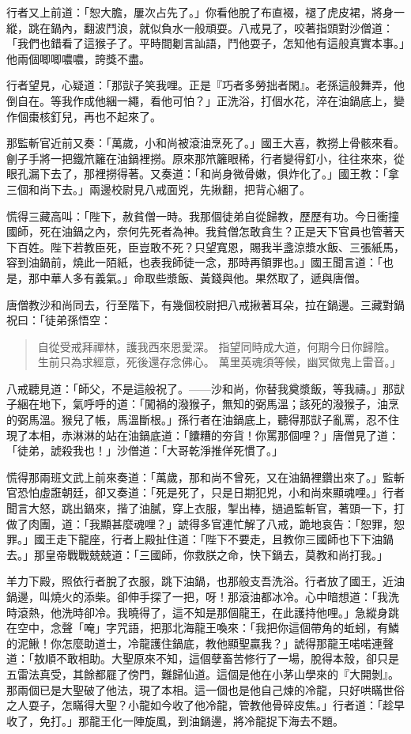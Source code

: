 行者又上前道：「恕大膽，屢次占先了。」你看他脫了布直裰，褪了虎皮裙，將身一縱，跳在鍋內，翻波鬥浪，就似負水一般頑耍。八戒見了，咬著指頭對沙僧道：「我們也錯看了這猴子了。平時間劖言訕語，鬥他耍子，怎知他有這般真實本事。」他兩個唧唧噥噥，誇獎不盡。

行者望見，心疑道：「那獃子笑我哩。正是『巧者多勞拙者閑』。老孫這般舞弄，他倒自在。等我作成他綑一繩，看他可怕？」正洗浴，打個水花，淬在油鍋底上，變作個棗核釘兒，再也不起來了。

那監斬官近前又奏：「萬歲，小和尚被滾油烹死了。」國王大喜，教撈上骨骸來看。劊子手將一把鐵笊籬在油鍋裡撈。原來那笊籬眼稀，行者變得釘小，往往來來，從眼孔漏下去了，那裡撈得著。又奏道：「和尚身微骨嫩，俱炸化了。」國王教：「拿三個和尚下去。」兩邊校尉見八戒面兇，先揪翻，把背心綑了。

慌得三藏高叫：「陛下，赦貧僧一時。我那個徒弟自從歸教，歷歷有功。今日衝撞國師，死在油鍋之內，奈何先死者為神。我貧僧怎敢貪生？正是天下官員也管著天下百姓。陛下若教臣死，臣豈敢不死？只望寬恩，賜我半盞涼漿水飯、三張紙馬，容到油鍋前，燒此一陌紙，也表我師徒一念，那時再領罪也。」國王聞言道：「也是，那中華人多有義氣。」命取些漿飯、黃錢與他。果然取了，遞與唐僧。

唐僧教沙和尚同去，行至階下，有幾個校尉把八戒揪著耳朵，拉在鍋邊。三藏對鍋祝曰：「徒弟孫悟空：
\begin{quote}
自從受戒拜禪林，護我西來恩愛深。
指望同時成大道，何期今日你歸陰。
生前只為求經意，死後還存念佛心。
萬里英魂須等候，幽冥做鬼上雷音。」
\end{quote}

八戒聽見道：「師父，不是這般祝了。——沙和尚，你替我奠漿飯，等我禱。」那獃子綑在地下，氣呼呼的道：「闖禍的潑猴子，無知的弼馬溫；該死的潑猴子，油烹的弼馬溫。猴兒了帳，馬溫斷根。」孫行者在油鍋底上，聽得那獃子亂罵，忍不住現了本相，赤淋淋的站在油鍋底道：「饢糟的夯貨！你罵那個哩？」唐僧見了道：「徒弟，諕殺我也！」沙僧道：「大哥乾淨推佯死慣了。」

慌得那兩班文武上前來奏道：「萬歲，那和尚不曾死，又在油鍋裡鑽出來了。」監斬官恐怕虛誑朝廷，卻又奏道：「死是死了，只是日期犯兇，小和尚來顯魂哩。」行者聞言大怒，跳出鍋來，揩了油膩，穿上衣服，掣出棒，撾過監斬官，著頭一下，打做了肉團，道：「我顯甚麼魂哩？」諕得多官連忙解了八戒，跪地哀告：「恕罪，恕罪。」國王走下龍座，行者上殿扯住道：「陛下不要走，且教你三國師也下下油鍋去。」那皇帝戰戰兢兢道：「三國師，你救朕之命，快下鍋去，莫教和尚打我。」

羊力下殿，照依行者脫了衣服，跳下油鍋，也那般支吾洗浴。行者放了國王，近油鍋邊，叫燒火的添柴。卻伸手探了一把，呀！那滾油都冰冷。心中暗想道：「我洗時滾熱，他洗時卻冷。我曉得了，這不知是那個龍王，在此護持他哩。」急縱身跳在空中，念聲「唵」字咒語，把那北海龍王喚來：「我把你這個帶角的蚯蚓，有鱗的泥鰍！你怎麼助道士，冷龍護住鍋底，教他顯聖贏我？」諕得那龍王喏喏連聲道：「敖順不敢相助。大聖原來不知，這個孽畜苦修行了一場，脫得本殼，卻只是五雷法真受，其餘都屣了傍門，難歸仙道。這個是他在小茅山學來的『大開剝』。那兩個已是大聖破了他法，現了本相。這一個也是他自己煉的冷龍，只好哄瞞世俗之人耍子，怎瞞得大聖？小龍如今收了他冷龍，管教他骨碎皮焦。」行者道：「趁早收了，免打。」那龍王化一陣旋風，到油鍋邊，將冷龍捉下海去不題。

